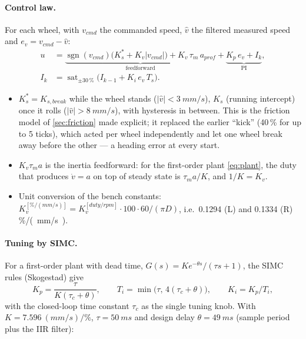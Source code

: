 \documentclass[11pt,a4paper]{article}
\newcommand{\sgn}{\operatorname{sgn}}
\newcommand{\sat}{\operatorname{sat}}
\begin{document}
\paragraph{Control law.} For each wheel, with $v_{cmd}$ the commanded speed,
$\hat v$ the filtered measured speed and $e_v=v_{cmd}-\hat v$:
\begin{equation}
\begin{aligned}
u &= \underbrace{\sgn(v_{cmd})\bigl(K_s^{*}+K_v|v_{cmd}|\bigr)+K_v\,\tau_m\,a_{prof}}_{\text{feedforward}}
   +\underbrace{K_p\,e_v+I_k}_{\text{PI}},\\
I_k &= \sat_{\pm30\,\%}\bigl(I_{k-1}+K_i\,e_v\,T_s\bigr).
\end{aligned}
\label{eq:speedlaw}
\end{equation}
\begin{itemize}[leftmargin=6mm]
\item $K_s^{*}=K_{s,break}$ while the wheel stands ($|\hat v|<\qty{3}{mm/s}$),
$K_s$ (running intercept) once it rolls ($|\hat v|>\qty{8}{mm/s}$), with
hysteresis in between. This is the friction model of \cref{sec:friction} made
explicit; it replaced the earlier ``kick'' (40\,\% for up to 5 ticks), which acted
per wheel independently and let one wheel break away before the other --- a
heading error at every start.
\item $K_v\tau_m a$ is the inertia feedforward: for the first-order plant
\cref{eq:plant}, the duty that produces $\dot v=a$ on top of steady state is
$\tau_m a/K$, and $1/K=K_v$.
\item Unit conversion of the bench constants:
$K_v^{[\%/(mm/s)]}=K_v^{[duty/rpm]}\cdot100\cdot60/(\pi D)$, i.e.\
0.1294 (L) and 0.1334 (R) \si{\percent/(mm/s)}.
\end{itemize}

\paragraph{Tuning by SIMC.} For a first-order plant with dead time,
$G(s)=Ke^{-\theta s}/(\tau s+1)$, the SIMC rules (Skogestad) give
\begin{equation}
K_p=\frac{\tau}{K(\tau_c+\theta)},\qquad T_i=\min\bigl(\tau,\,4(\tau_c+\theta)\bigr),\qquad K_i=K_p/T_i,
\end{equation}
with the closed-loop time constant $\tau_c$ as the single tuning knob. With
$K=\qty{7.596}{(mm/s)/\percent}$, $\tau=\qty{50}{ms}$ and design delay
$\theta=\qty{49}{ms}$ (sample period plus the IIR filter):
\end{document}
